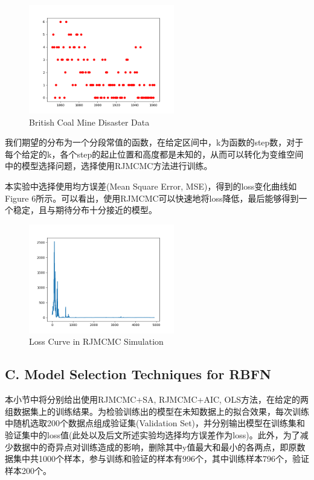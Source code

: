 \documentclass[twocolumn]{article}
\begin{document}
\begin{figure}[H]
  \centering
  \includegraphics[width=2.5in]{coal_data.png}
  \caption{British Coal Mine Disaster Data}
\end{figure}

我们期望的分布为一个分段常值的函数，在给定区间中，k为函数的step数，对于每个给定的k，各个step的起止位置和高度都是未知的，从而可以转化为变维空间中的模型选择问题，选择使用RJMCMC方法进行训练。

本实验中选择使用均方误差(Mean Square Error, MSE)，得到的loss变化曲线如Figure 6所示。可以看出，使用RJMCMC可以快速地将loss降低，最后能够得到一个稳定，且与期待分布十分接近的模型。

\begin{figure}[H]
  \centering
  \includegraphics[width=2.5in]{loss_rjmcmc.png}
  \caption{Loss Curve in RJMCMC Simulation}
\end{figure}

\subsection*{C. Model Selection Techniques for RBFN}

本小节中将分别给出使用RJMCMC+SA, RJMCMC+AIC, OLS方法，在给定的两组数据集上的训练结果。为检验训练出的模型在未知数据上的拟合效果，每次训练中随机选取200个数据点组成验证集(Validation Set)，并分别输出模型在训练集和验证集中的loss值(此处以及后文所述实验均选择均方误差作为loss)。此外，为了减少数据中的奇异点对训练造成的影响，删除其中y值最大和最小的各两点，即原数据集中共1000个样本，参与训练和验证的样本有996个，其中训练样本796个，验证样本200个。
\end{document}
